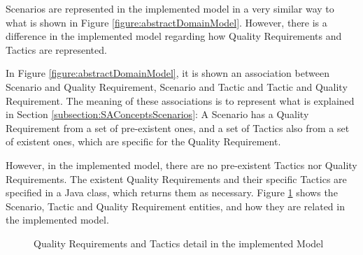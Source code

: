 Scenarios are represented in the implemented model in a very similar way to what is shown in Figure \ref{figure:abstractDomainModel}. However, there is a difference in the implemented model regarding how Quality Requirements and Tactics are represented.

In Figure \ref{figure:abstractDomainModel},  it is shown an association between Scenario and Quality Requirement, Scenario and Tactic and Tactic and Quality Requirement. The meaning of these associations is to represent what is explained in Section \ref{subsection:SAConceptsScenarios}: A Scenario has a Quality Requirement from a set of pre-existent ones, and a set of Tactics also from a set of existent ones, which are specific for the Quality Requirement.

However, in the implemented model, there are no pre-existent Tactics nor Quality Requirements. The existent Quality Requirements and their specific Tactics are specified in a Java class, which returns them as necessary. Figure \ref{figure:modelQRTactics} shows the Scenario, Tactic and Quality Requirement entities, and how they are related in the implemented model.

\begin{figure}[h]
\centering
\renewcommand {\umltextcolor}{black}
\renewcommand {\umlfillcolor}{none}
\renewcommand {\umldrawcolor}{black}

\caption{Quality Requirements and Tactics detail in the implemented Model}
\label{figure:modelQRTactics}
\end{figure}

